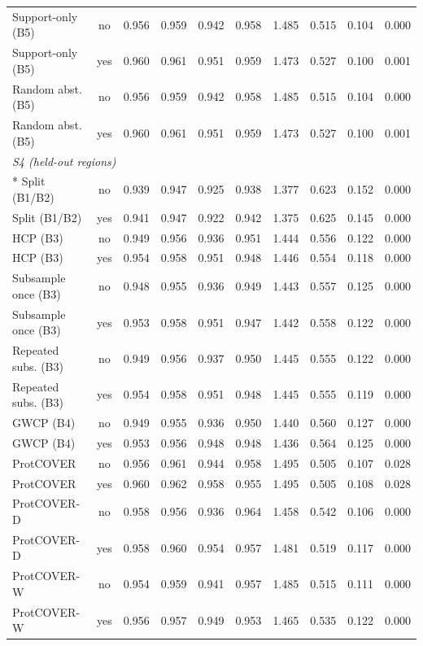 \begin{longtable}{lccccccccc}
Support-only (B5) & no & 0.956 & 0.959 & 0.942 & 0.958 & 1.485 & 0.515 & 0.104 & 0.000 \\
Support-only (B5) & yes & 0.960 & 0.961 & 0.951 & 0.959 & 1.473 & 0.527 & 0.100 & 0.001 \\
Random abst. (B5) & no & 0.956 & 0.959 & 0.942 & 0.958 & 1.485 & 0.515 & 0.104 & 0.000 \\
Random abst. (B5) & yes & 0.960 & 0.961 & 0.951 & 0.959 & 1.473 & 0.527 & 0.100 & 0.001 \\
\midrule
\multicolumn{10}{l}{\emph{S4 (held-out regions)}}\\*
Split (B1/B2) & no & 0.939 & 0.947 & 0.925 & 0.938 & 1.377 & 0.623 & 0.152 & 0.000 \\
Split (B1/B2) & yes & 0.941 & 0.947 & 0.922 & 0.942 & 1.375 & 0.625 & 0.145 & 0.000 \\
HCP (B3) & no & 0.949 & 0.956 & 0.936 & 0.951 & 1.444 & 0.556 & 0.122 & 0.000 \\
HCP (B3) & yes & 0.954 & 0.958 & 0.951 & 0.948 & 1.446 & 0.554 & 0.118 & 0.000 \\
Subsample once (B3) & no & 0.948 & 0.955 & 0.936 & 0.949 & 1.443 & 0.557 & 0.125 & 0.000 \\
Subsample once (B3) & yes & 0.953 & 0.958 & 0.951 & 0.947 & 1.442 & 0.558 & 0.122 & 0.000 \\
Repeated subs. (B3) & no & 0.949 & 0.956 & 0.937 & 0.950 & 1.445 & 0.555 & 0.122 & 0.000 \\
Repeated subs. (B3) & yes & 0.954 & 0.958 & 0.951 & 0.948 & 1.445 & 0.555 & 0.119 & 0.000 \\
GWCP (B4) & no & 0.949 & 0.955 & 0.936 & 0.950 & 1.440 & 0.560 & 0.127 & 0.000 \\
GWCP (B4) & yes & 0.953 & 0.956 & 0.948 & 0.948 & 1.436 & 0.564 & 0.125 & 0.000 \\
ProtCOVER & no & 0.956 & 0.961 & 0.944 & 0.958 & 1.495 & 0.505 & 0.107 & 0.028 \\
ProtCOVER & yes & 0.960 & 0.962 & 0.958 & 0.955 & 1.495 & 0.505 & 0.108 & 0.028 \\
ProtCOVER-D & no & 0.958 & 0.956 & 0.936 & 0.964 & 1.458 & 0.542 & 0.106 & 0.000 \\
ProtCOVER-D & yes & 0.958 & 0.960 & 0.954 & 0.957 & 1.481 & 0.519 & 0.117 & 0.000 \\
ProtCOVER-W & no & 0.954 & 0.959 & 0.941 & 0.957 & 1.485 & 0.515 & 0.111 & 0.000 \\
ProtCOVER-W & yes & 0.956 & 0.957 & 0.949 & 0.953 & 1.465 & 0.535 & 0.122 & 0.000 \\

\end{longtable}
